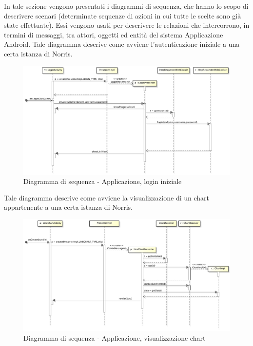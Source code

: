         In tale sezione vengono presentati i diagrammi di sequenza, che hanno lo scopo di descrivere scenari (determinate sequenze di azioni in cui tutte le scelte sono già state effettuate). Essi vengono usati per descrivere le relazioni che intercorrono, in termini di messaggi, tra attori, oggetti ed entità del sistema Applicazione Android.
            Tale diagramma descrive come avviene l'autenticazione iniziale a una certa istanza di Norris.
            \begin{figure}[H]
                \centering
                \includegraphics[scale=0.3]{DefinizioneDiProdotto/Pics/ApplicazioneLogin}
                \caption{Diagramma di sequenza - Applicazione, login iniziale}
            \end{figure}


            Tale diagramma descrive come avviene la visualizzazione di un chart appartenente a una certa istanza di Norris.
            \begin{figure}[H]
                \centering
                \includegraphics[scale=0.3]{DefinizioneDiProdotto/Pics/ApplicazioneVisualizzazioneChart}
                \caption{Diagramma di sequenza - Applicazione, visualizzazione chart}
            \end{figure}

